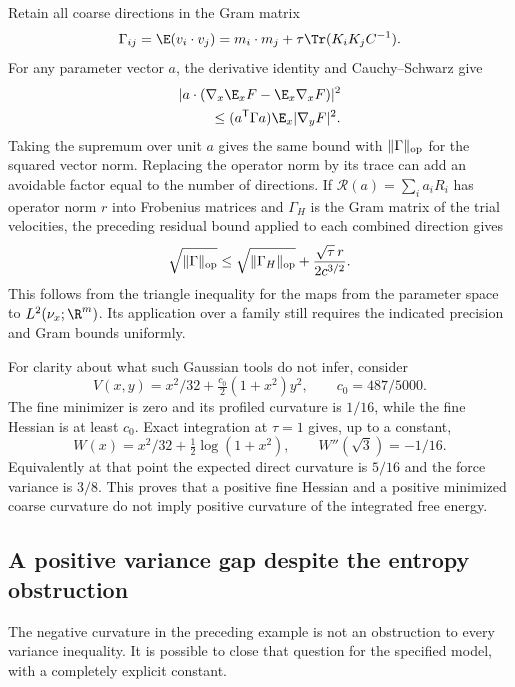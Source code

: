 Retain all coarse directions in the Gram matrix
\[
 \Gamma_{ij}=\E(v_i\cdot v_j)
       =m_i\cdot m_j+\tau\Tr(K_iK_jC^{-1}).
\]
For any parameter vector $a$, the derivative identity and
Cauchy--Schwarz give
\begin{align*}
 &|a\cdot(\nabla_x\E_xF-\E_x\nabla_xF)|^2\\
 &\hspace{8mm}\le(a^{\mathsf T}\Gamma a)\E_x|\nabla_yF|^2.
\end{align*}
Taking the supremum over unit $a$ gives the same bound with
$\|\Gamma\|_{\rm op}$ for the squared vector norm. Replacing the
operator norm by its trace can add an avoidable factor equal to the
number of directions. If $\mathcal R(a)=\sum_i a_iR_i$ has operator
norm $r$ into Frobenius matrices and $\Gamma_H$ is the Gram matrix of
the trial velocities, the preceding residual bound applied to each
combined direction gives
\[
 \sqrt{\|\Gamma\|_{\rm op}}
 \le\sqrt{\|\Gamma_H\|_{\rm op}}+\frac{\sqrt\tau\,r}{2c^{3/2}}.
\]
This follows from the triangle inequality for the maps from the
parameter space to $L^2(\nu_x;\R^m)$. Its application over a family
still requires the indicated precision and Gram bounds uniformly.

For clarity about what such Gaussian tools do not infer, consider
\[
 V(x,y)=x^2/32+\tfrac{c_0}2(1+x^2)y^2,
 \qquad c_0=487/5000.
\]
The fine minimizer is zero and its profiled curvature is $1/16$,
while the fine Hessian is at least $c_0$. Exact integration at
$\tau=1$ gives, up to a constant,
\[
 W(x)=x^2/32+\tfrac12\log(1+x^2),\qquad W''(\sqrt3)=-1/16.
\]
Equivalently at that point the expected direct curvature is $5/16$
and the force variance is $3/8$. This proves that a positive fine
Hessian and a positive minimized coarse curvature do not imply
positive curvature of the integrated free energy.

\subsection{A positive variance gap despite the entropy obstruction}
The negative curvature in the preceding example is not an obstruction
to every variance inequality. It is possible to close that question
for the specified model, with a completely explicit constant.

